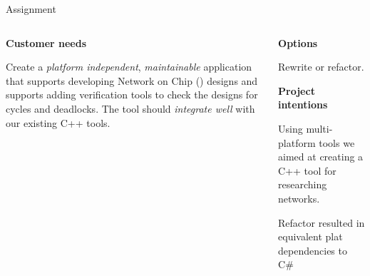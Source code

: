 \documentclass[11pt]{beamer}
\begin{document}
\begin{frame}{Assignment}
	\begin{columns}
		\begin{column}[t]{5cm}
		
		\textbf{Customer needs}

		Create a {\it platform independent}, {\it maintainable} application that supports
		developing Network on Chip (\Noc) designs and supports adding verification tools
		to check the \Noc designs for cycles and deadlocks. The tool should {\it integrate well}
		with our existing C++ tools.

		\end{column}
		\begin{column}[t]{5cm}
		\textbf{Options}		
		
		Rewrite or refactor.
		
		{\bf Project intentions}		
		
		Using multi-platform tools we aimed at creating a C++ tool for researching \Noc networks.
		
		Refactor resulted in equivalent plat dependencies to C\#
		\end{column}
	\end{columns}
\end{frame}
\end{document}
